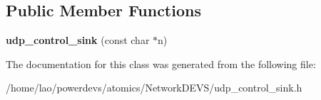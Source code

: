 \subsection*{Public Member Functions}
\begin{DoxyCompactItemize}
\item 
{\bfseries udp\+\_\+control\+\_\+sink} (const char $\ast$n)\hypertarget{classudp__control__sink_a3a5224e02175e0a55590ad1d7009fd61}{}\label{classudp__control__sink_a3a5224e02175e0a55590ad1d7009fd61}

\end{DoxyCompactItemize}


The documentation for this class was generated from the following file\+:\begin{DoxyCompactItemize}
\item 
/home/lao/powerdevs/atomics/\+Network\+D\+E\+V\+S/udp\+\_\+control\+\_\+sink.\+h\end{DoxyCompactItemize}
